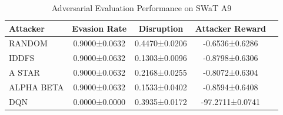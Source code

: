 
\begin{table}[htbp]
\caption{Adversarial Evaluation Performance on SWaT A9}
\label{tab:adversarial_eval}
\centering
\begin{tabular}{lcccc}
\hline
\textbf{Attacker} & \textbf{Evasion Rate} & \textbf{Disruption} & \textbf{Attacker Reward} \\ \hline
RANDOM & 0.9000±0.0632 & 0.4470±0.0206 & -0.6536±0.6286 \\
IDDFS & 0.9000±0.0632 & 0.1303±0.0096 & -0.8798±0.6306 \\
A STAR & 0.9000±0.0632 & 0.2168±0.0255 & -0.8072±0.6304 \\
ALPHA BETA & 0.9000±0.0632 & 0.1533±0.0402 & -0.8594±0.6408 \\
DQN & 0.0000±0.0000 & 0.3935±0.0172 & -97.2711±0.0741 \\
\hline
\end{tabular}
\end{table}
